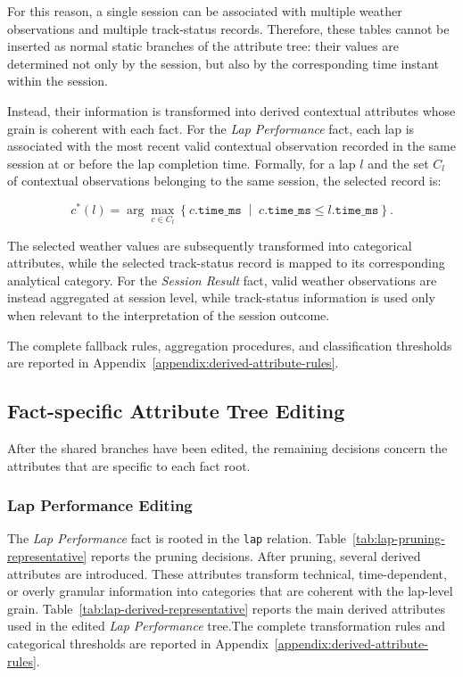 \documentclass[11pt,a4paper]{article}
\begin{document}
	For this reason, a single session can be associated with multiple
	weather observations and multiple track-status records. Therefore,
	these tables cannot be inserted as normal static branches of the
	attribute tree: their values are determined not only by the session,
	but also by the corresponding time instant within the session.
	
	Instead, their information is transformed into derived contextual
	attributes whose grain is coherent with each fact. For the
	\textit{Lap Performance} fact, each lap is associated with the most
	recent valid contextual observation recorded in the same session at
	or before the lap completion time. Formally, for a lap $l$ and the set
	$C_l$ of contextual observations belonging to the same session, the
	selected record is:
	
	\[
	c^{*}(l)=
	\arg\max_{c \in C_l}
	\left\{
	c.\texttt{time\_ms}
	\;\middle|\;
	c.\texttt{time\_ms} \leq l.\texttt{time\_ms}
	\right\}.
	\]
	
	The selected weather values are subsequently transformed into
	categorical attributes, while the selected track-status record is
	mapped to its corresponding analytical category. For the
	\textit{Session Result} fact, valid weather observations are instead
	aggregated at session level, while track-status information is used
	only when relevant to the interpretation of the session outcome.
	
	The complete fallback rules, aggregation procedures, and
	classification thresholds are reported in
	Appendix~\ref{appendix:derived-attribute-rules}.
	
	\subsection{Fact-specific Attribute Tree Editing}
	
	After the shared branches have been edited, the remaining decisions concern the attributes that are specific to each fact root. 

	
	\subsubsection{Lap Performance Editing}
	
	The \textit{Lap Performance} fact is rooted in the \texttt{lap} relation. Table~\ref{tab:lap-pruning-representative} reports the pruning decisions.
	After pruning, several derived attributes are introduced. 
	These attributes transform technical, time-dependent, or overly granular information into categories that are coherent with the lap-level grain. 
	Table~\ref{tab:lap-derived-representative} reports the main derived attributes used in the edited \textit{Lap Performance} tree.The complete transformation rules and categorical thresholds are
	reported in Appendix~\ref{appendix:derived-attribute-rules}.
	
\end{document}
